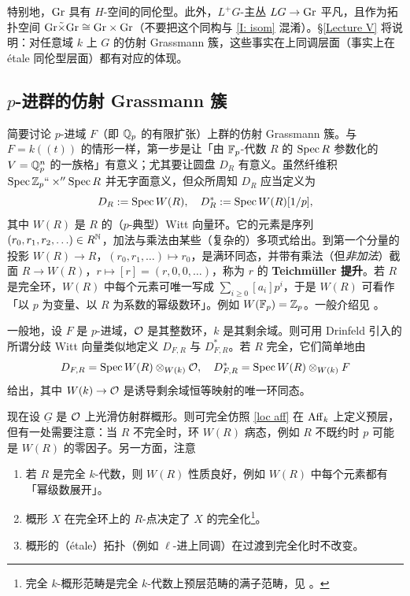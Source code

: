 \begin{rmk}
特别地，${\operatorname{Gr}}$ 具有 $H$-空间的同伦型。此外，$L^+G$-主丛 $LG\to {\operatorname{Gr}}$ 平凡，且作为拓扑空间 ${\operatorname{Gr}}\tilde\times{\operatorname{Gr}}\cong {\operatorname{Gr}}\times{\operatorname{Gr}}$（不要把这个同构与 \eqref{I: isom} 混淆）。\S\ref{Lecture V} 将说明：对任意域 $k$ 上 $G$ 的仿射 Grassmann 簇，这些事实在上同调层面（事实上在 \'etale 同伦型层面）都有对应的体现。
\end{rmk}

\subsection{$p$-进群的仿射 Grassmann 簇}\label{p-adic}

简要讨论 $p$-进域 $F$（即 ${\mathbb Q}_p$ 的有限扩张）上群的仿射 Grassmann 簇。与 $F=k((t))$ 的情形一样，第一步是让「由 ${\mathbb F}_p$-代数 $R$ 的 $\operatorname{Spec} R$ 参数化的 $V={\mathbb Q}_p^n$ 的一族格」有意义；尤其要让圆盘 $D_R$ 有意义。虽然纤维积 $\operatorname{Spec} {\mathbb Z}_p``\times''\operatorname{Spec} R$ 并无字面意义，但众所周知 $D_R$ 应当定义为
\[D_R:=\operatorname{Spec} W(R),\quad D^*_R:=\operatorname{Spec} W(R)[1/p],\]
其中 $W(R)$ 是 $R$ 的（$p$-典型）Witt 向量环。它的元素是序列 $(r_0,r_1,r_2,\ldots)\in R^{{\mathbb N}}$，加法与乘法由某些（复杂的）多项式给出。到第一个分量的投影 $W(R)\to R$，$(r_0,r_1,\ldots)\mapsto r_0$，是满环同态，并带有乘法（但\emph{非加法}）截面 $R\to W(R)$，$r\mapsto [r]=(r,0,0,\ldots)$，称为 $r$ 的 \textbf{Teichm\"uller 提升}。若 $R$ 是完全环，$W(R)$ 中每个元素可唯一写成 $\sum_{i\geq 0} [a_i]p^i$，于是 $W(R)$ 可看作「以 $p$ 为变量、以 $R$ 为系数的幂级数环」。例如 $W({\mathbb F}_p)={\mathbb Z}_p$。一般介绍见 \cite[\S\ II.5]{Se2}。

一般地，设 $F$ 是 $p$-进域，${\mathcal O}$ 是其整数环，$k$ 是其剩余域。则可用 Drinfeld 引入的所谓分歧 Witt 向量类似地定义 $D_{F,R}$ 与 $D^*_{F,R}$。若 $R$ 完全，它们简单地由
\[D_{F,R}= \operatorname{Spec} W(R)\otimes_{W(k)}{\mathcal O},\quad D^*_{F,R}= \operatorname{Spec} W(R)\otimes_{W(k)}F\]
给出，其中 $W(k)\to {\mathcal O}$ 是诱导剩余域恒等映射的唯一环同态。

现在设 $\underline G$ 是 ${\mathcal O}$ 上光滑仿射群概形。则可完全仿照 \eqref{loc aff} 在 $\operatorname{Aff}_k$ 上定义预层，但有一处需要注意：当 $R$ 不完全时，环 $W(R)$ 病态，例如 $R$ 不既约时 $p$ 可能是 $W(R)$ 的零因子。另一方面，注意

\begin{enumerate}
\item 若 $R$ 是完全 $k$-代数，则 $W(R)$ 性质良好，例如 $W(R)$ 中每个元素都有「幂级数展开」。
\item 概形 $X$ 在完全环上的 $R$-点决定了 $X$ 的完全化\footnote{完全 $k$-概形范畴是完全 $k$-代数上预层范畴的满子范畴，见 \cite[Lemma A.10]{Z14}。}。
\item 概形的（\'etale）拓扑（例如 $\ell$-进上同调）在过渡到完全化时不改变。
\end{enumerate}

